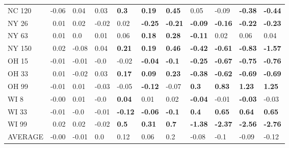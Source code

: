 \begin{tabular}{lrlllllllll}
NC 120  &    -0.06 &            0.04 &            0.03 &    \textbf{0.3} &   \textbf{0.19} &   \textbf{0.45} &            0.05 &           -0.09 &  \textbf{-0.38} &  \textbf{-0.44} \\
NY 26   &     0.01 &            0.02 &           -0.02 &            0.02 &  \textbf{-0.25} &  \textbf{-0.21} &  \textbf{-0.09} &  \textbf{-0.16} &  \textbf{-0.22} &  \textbf{-0.23} \\
NY 63   &     0.01 &             0.0 &            0.01 &            0.06 &   \textbf{0.18} &   \textbf{0.28} &  \textbf{-0.11} &            0.02 &            0.06 &            0.04 \\
NY 150  &     0.02 &           -0.08 &            0.04 &   \textbf{0.21} &   \textbf{0.19} &   \textbf{0.46} &  \textbf{-0.42} &  \textbf{-0.61} &  \textbf{-0.83} &  \textbf{-1.57} \\
OH 15   &    -0.01 &           -0.01 &            -0.0 &           -0.02 &  \textbf{-0.04} &   \textbf{-0.1} &  \textbf{-0.25} &  \textbf{-0.67} &  \textbf{-0.75} &  \textbf{-0.76} \\
OH 33   &     0.01 &           -0.02 &            0.03 &   \textbf{0.17} &   \textbf{0.09} &   \textbf{0.23} &  \textbf{-0.38} &  \textbf{-0.62} &  \textbf{-0.69} &  \textbf{-0.69} \\
OH 99   &    -0.01 &            0.01 &           -0.03 &           -0.05 &  \textbf{-0.12} &           -0.07 &    \textbf{0.3} &   \textbf{0.83} &   \textbf{1.23} &   \textbf{1.25} \\
WI 8    &    -0.00 &            0.01 &            -0.0 &   \textbf{0.04} &            0.01 &            0.02 &  \textbf{-0.04} &           -0.01 &  \textbf{-0.03} &           -0.03 \\
WI 33   &    -0.01 &            -0.0 &           -0.01 &  \textbf{-0.12} &  \textbf{-0.06} &   \textbf{-0.1} &    \textbf{0.4} &   \textbf{0.65} &   \textbf{0.64} &   \textbf{0.65} \\
WI 99   &     0.02 &            0.02 &           -0.02 &    \textbf{0.5} &   \textbf{0.31} &    \textbf{0.7} &  \textbf{-1.38} &  \textbf{-2.37} &  \textbf{-2.56} &  \textbf{-2.76} \\
AVERAGE &    -0.00 &           -0.01 &             0.0 &            0.12 &            0.06 &             0.2 &           -0.08 &            -0.1 &           -0.09 &           -0.12 \\
\bottomrule
\end{tabular}
